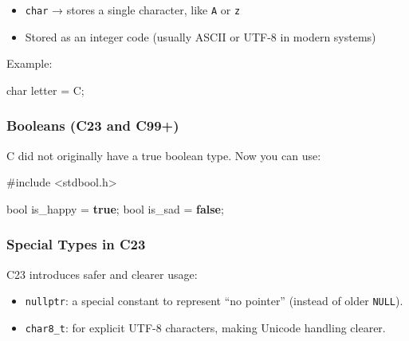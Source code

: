 \documentclass[
  letterpaper,
  DIV=11,
  numbers=noendperiod]{scrreprt}
\newenvironment{Shaded}{\begin{snugshade}}{\end{snugshade}}
\newcommand{\CharTok}[1]{\textcolor[rgb]{0.13,0.47,0.30}{#1}}
\newcommand{\DataTypeTok}[1]{\textcolor[rgb]{0.68,0.00,0.00}{#1}}
\newcommand{\ImportTok}[1]{\textcolor[rgb]{0.00,0.46,0.62}{#1}}
\newcommand{\KeywordTok}[1]{\textcolor[rgb]{0.00,0.23,0.31}{\textbf{#1}}}
\newcommand{\NormalTok}[1]{\textcolor[rgb]{0.00,0.23,0.31}{#1}}
\newcommand{\OperatorTok}[1]{\textcolor[rgb]{0.37,0.37,0.37}{#1}}
\newcommand{\PreprocessorTok}[1]{\textcolor[rgb]{0.68,0.00,0.00}{#1}}
\providecommand{\tightlist}{%
  \setlength{\itemsep}{0pt}\setlength{\parskip}{0pt}}
\begin{document}
\begin{itemize}
\tightlist
\item
  \texttt{char} → stores a single character, like
  \texttt{\textquotesingle{}A\textquotesingle{}} or
  \texttt{\textquotesingle{}z\textquotesingle{}}
\item
  Stored as an integer code (usually ASCII or UTF-8 in modern systems)
\end{itemize}

Example:

\begin{Shaded}
\begin{Highlighting}[]
\DataTypeTok{char}\NormalTok{ letter }\OperatorTok{=} \CharTok{\textquotesingle{}C\textquotesingle{}}\OperatorTok{;}
\end{Highlighting}
\end{Shaded}

\subsubsection{Booleans (C23 and C99+)}\label{booleans-c23-and-c99}

C did not originally have a true boolean type. Now you can use:

\begin{Shaded}
\begin{Highlighting}[]
\PreprocessorTok{\#include }\ImportTok{\textless{}stdbool.h\textgreater{}}

\DataTypeTok{bool}\NormalTok{ is\_happy }\OperatorTok{=} \KeywordTok{true}\OperatorTok{;}
\DataTypeTok{bool}\NormalTok{ is\_sad }\OperatorTok{=} \KeywordTok{false}\OperatorTok{;}
\end{Highlighting}
\end{Shaded}

\subsubsection{Special Types in C23}\label{special-types-in-c23}

C23 introduces safer and clearer usage:

\begin{itemize}
\tightlist
\item
  \texttt{nullptr}: a special constant to represent ``no pointer''
  (instead of older \texttt{NULL}).
\item
  \texttt{char8\_t}: for explicit UTF-8 characters, making Unicode
  handling clearer.
\end{itemize}
\end{document}
